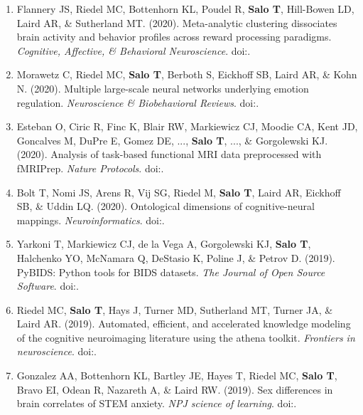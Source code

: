 \documentclass[10pt]{article}
\newcommand{\textlink}[3][blue]{\href{#2}{\color{#1}{#3}}}
\begin{document}
\begin{enumerate}
	\item Flannery JS, Riedel MC, Bottenhorn KL, Poudel R, \textbf{Salo T}, Hill-Bowen LD, Laird AR, \& Sutherland MT.
	(2020).
	Meta-analytic clustering dissociates brain activity and behavior profiles across reward processing paradigms.
	\emph{Cognitive, Affective, \& Behavioral Neuroscience}.
	doi:\textlink{https://doi.org/10.3758/s13415-019-00763-7}{10.3758/s13415-019-00763-7}.

	\item Morawetz C, Riedel MC, \textbf{Salo T}, Berboth S, Eickhoff SB, Laird AR, \& Kohn N.
	(2020).
	Multiple large-scale neural networks underlying emotion regulation.
	\emph{Neuroscience \& Biobehavioral Reviews}.
	doi:\textlink{https://doi.org/10.1016/j.neubiorev.2020.07.001}{10.1016/j.neubiorev.2020.07.001}.

	\item Esteban O, Ciric R, Finc K, Blair RW, Markiewicz CJ, Moodie CA, Kent JD, Goncalves M, DuPre E, Gomez DE, ..., \textbf{Salo T}, ..., \& Gorgolewski KJ.
	(2020).
	Analysis of task-based functional MRI data preprocessed with fMRIPrep.
	\emph{Nature Protocols}.
	doi:\textlink{https://doi.org/10.1038/s41596-020-0327-3}{10.1038/s41596-020-0327-3}.

	\item Bolt T, Nomi JS, Arens R, Vij SG, Riedel M, \textbf{Salo T}, Laird AR, Eickhoff SB, \& Uddin LQ.
	(2020).
	Ontological dimensions of cognitive-neural mappings.
	\emph{Neuroinformatics}.
	doi:\textlink{https://doi.org/10.1007/s12021-020-09454-y}{10.1007/s12021-020-09454-y}.

	\item Yarkoni T, Markiewicz CJ, de la Vega A, Gorgolewski KJ, \textbf{Salo T}, Halchenko YO, McNamara Q, DeStasio K, Poline J, \& Petrov D.
	(2019).
	PyBIDS: Python tools for BIDS datasets.
	\emph{The Journal of Open Source Software}.
	doi:\textlink{https://doi.org/10.21105/joss.01294}{10.21105/joss.01294}.

	\item Riedel MC, \textbf{Salo T}, Hays J, Turner MD, Sutherland MT, Turner JA, \& Laird AR.
	(2019).
	Automated, efficient, and accelerated knowledge modeling of the cognitive neuroimaging literature using the athena toolkit.
	\emph{Frontiers in neuroscience}.
	doi:\textlink{https://www.frontiersin.org/articles/10.3389/fnins.2019.00494/}{10.3389/fnins.2019.00494}.

	\item Gonzalez AA, Bottenhorn KL, Bartley JE, Hayes T, Riedel MC, \textbf{Salo T}, Bravo EI, Odean R, Nazareth A, \& Laird RW.
	(2019).
	Sex differences in brain correlates of STEM anxiety.
	\emph{NPJ science of learning}.
	doi:\textlink{https://doi.org/10.1038/s41539-019-0058-9}{10.1038/s41539-019-0058-9}.


\end{enumerate}
\end{document}

